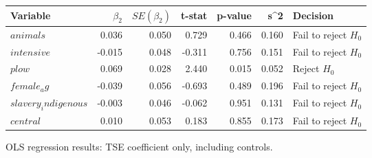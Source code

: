 \centering
\begin{tabular}{lrrrrrl}
\hline
Variable & $\beta_2$ & $SE(\beta_2)$ & t-stat & p-value & s^2 & Decision \\
\hline
$animals$ & 0.036 & 0.050 & 0.729 & 0.466 & 0.160 & Fail to reject $H_0$ \\
$intensive$ & -0.015 & 0.048 & -0.311 & 0.756 & 0.151 & Fail to reject $H_0$ \\
$plow$ & 0.069 & 0.028 & 2.440 & 0.015 & 0.052 & Reject $H_0$ \\
$female_ag$ & -0.039 & 0.056 & -0.693 & 0.489 & 0.196 & Fail to reject $H_0$ \\
$slavery_indigenous$ & -0.003 & 0.046 & -0.062 & 0.951 & 0.131 & Fail to reject $H_0$ \\
$central$ & 0.010 & 0.053 & 0.183 & 0.855 & 0.173 & Fail to reject $H_0$ \\
\hline
\end{tabular}
\caption{OLS regression results: TSE coefficient only, including controls.}
\label{tab:regression_results_TSE}
